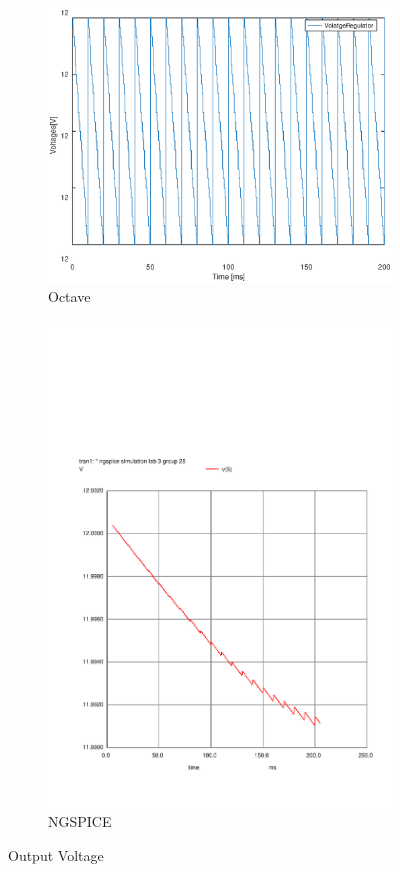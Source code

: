 \begin{figure}[H] 
\centering
\begin{subfigure}{0.4\textwidth}
\includegraphics[width=\textwidth]{VoltageRegulator.eps}
\caption{Octave}
\label{fig:first}
\end{subfigure}
\begin{subfigure}{0.3\textwidth}
\includegraphics[width=\textwidth]{sim33.pdf}
\caption{NGSPICE}
\label{fig:second}
\end{subfigure}
\caption{Output Voltage}
\end{figure}
